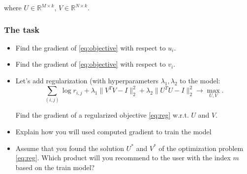 \documentclass{article}
\begin{document}
where $U \in \mathbb{R}^{M \times k}$, $V \in \mathbb{R}^{N \times k}$.

\subsubsection*{The task}
\begin{itemize}
    \item Find the gradient of \eqref{eq:objective} with respect to $u_i$.
    \item Find the gradient of \eqref{eq:objective} with respect to $v_i$.
    \item Let's add regularization (with hyperparameters $\lambda_1, \lambda_2$ to the model:
    \begin{equation}\label{eq:reg}
        \sum_{(i, j)} \log r_{i, j} + \lambda_1\|V^TV - I\|_2^2 + \lambda_2\|U^TU - I\|_2^2 \rightarrow \max_{U, V}.
    \end{equation}

    Find the gradient of a regularized objective \eqref{eq:reg} w.r.t. $U$ and $V$.

    \item Explain how you will used computed gradient to train the model
    \item Assume that you found the solution $U^*$ and $V^*$ of the optimization problem \eqref{eq:reg}. Which product will you recommend to the user with the index $m$ based on the train model?
\end{itemize}
\end{document}
